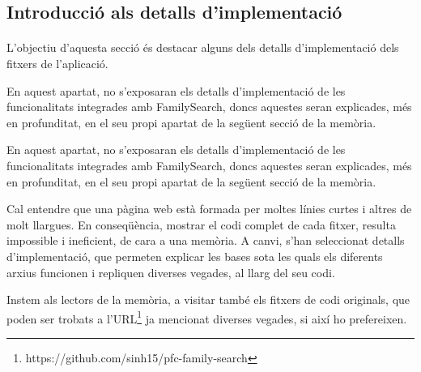 \subsection{Introducció als detalls d'implementació}

    \paragraph{}
    L'objectiu d'aquesta secció és destacar alguns dels detalls d'implementació dels fitxers de l'aplicació.

    En aquest apartat, no s'exposaran els detalls d'implementació de les funcionalitats integrades amb FamilySearch, doncs aquestes seran explicades, més en profunditat, en el seu propi apartat de la següent secció de la memòria.

    En aquest apartat, no s'exposaran els detalls d'implementació de les funcionalitats integrades amb FamilySearch, doncs aquestes seran explicades, més en profunditat, en el seu propi apartat de la següent secció de la memòria.

    Cal entendre que una pàgina web està formada per moltes línies curtes i altres de molt llargues. En conseqüència, mostrar el codi complet de cada fitxer, resulta impossible i ineficient, de cara a una memòria. A canvi, s'han seleccionat detalls d'implementació, que permeten explicar les bases sota les quals els diferents arxius funcionen i repliquen diverses vegades, al llarg del seu codi.

    Instem als lectors de la memòria, a visitar també els fitxers de codi originals, que poden ser trobats a l'URL\footnote{https://github.com/sinh15/pfc-family-search} ja mencionat diverses vegades, si així ho prefereixen.

